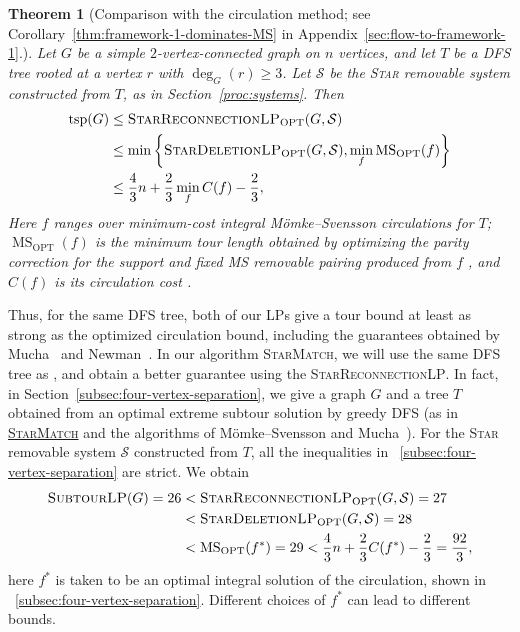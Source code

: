 \documentclass[11pt]{amsart}
\newcommand{\1}{\mathbbm{1}}
\newcommand{\ALG}{\textsc{StarMatch}}
\newcommand{\SubtourLP}{\textsc{SubtourLP}}
\newcommand{\MSopt}{\operatorname{MS}_{\mathrm{OPT}}}
\newcommand{\LPone}{\textsc{StarDeletionLP}}
\newcommand{\LPtwo}{\textsc{StarReconnectionLP}}
\newtheorem{theorem}{Theorem}[section]
\begin{document}
\begin{theorem}[Comparison with the circulation method; see {Corollary~\ref{thm:framework-1-dominates-MS}} in
Appendix~\ref{sec:flow-to-framework-1}.]
\label{thm:intro-circulation}
Let $G$ be a simple $2$-vertex-connected graph on $n$ vertices,
and let $T$ be a DFS tree rooted at a vertex $r$ with
$\deg_G(r)\ge3$. Let $\mathcal S$ be the \textsc{Star} removable system constructed
from $T$, as in Section~\ref{proc:systems}. Then
\[
 \begin{aligned}
 \operatorname{tsp}(G)
 &\le \text{\LPtwo}_{\mathrm{OPT}}(G,\mathcal S)\\
 &\le \min\left\{\text{\LPone}_{\mathrm{OPT}}(G,\mathcal S),
                  \min_f\MSopt(f)\right\}\\
 &\le \frac43n+{\frac23}\min_f C(f)-\frac23,
 \end{aligned}
\]
Here $f$ ranges over minimum-cost integral M\"omke--Svensson
circulations for $T$; $\MSopt(f)$ is the minimum
tour length obtained by optimizing the parity correction
for the support and fixed MS removable pairing produced from $f$
\cite[proof of Theorem~12.3]{TraubVygen}, and $C(f)$ is its
circulation cost \cite[Lemma~12.8]{TraubVygen}.
\end{theorem}
Thus, for the same DFS tree, both of our LPs give a tour bound at
least as strong as the optimized circulation bound, including
the guarantees obtained by Mucha~\cite{Mucha} and Newman~\cite{Newman}. In our algorithm \ALG, we will use the same DFS tree as \cite{MomkeSvensson}, and obtain a better guarantee using the \LPtwo. In fact, in Section~\ref{subsec:four-vertex-separation}, we give a graph
$G$ and a tree $T$ obtained from an optimal extreme subtour
solution by greedy DFS (as in \hyperref[proc:algorithm]{\ALG}
and the algorithms of M\"omke--Svensson and
Mucha~\cite{MomkeSvensson,Mucha}).
For the \textsc{Star} removable system $\mathcal S$ constructed from $T$, all the inequalities in ~\ref{subsec:four-vertex-separation} are strict.
We obtain
\[
 \begin{aligned}
 {\text{\SubtourLP}(G)}=26
 &<\text{\LPtwo}_{\mathrm{OPT}}(G,\mathcal S)=27\\
 &<\text{\LPone}_{\mathrm{OPT}}(G,\mathcal S)=28\\
 &<\MSopt(f^*)=29 <\frac43n+\frac23C(f^*)-\frac23=\frac{92}{3},
 \end{aligned}
\]
here $f^*$ is taken to be an optimal integral solution of the circulation, shown in ~\ref{subsec:four-vertex-separation}. Different choices of $f^*$ can lead to different bounds.
\end{document}
